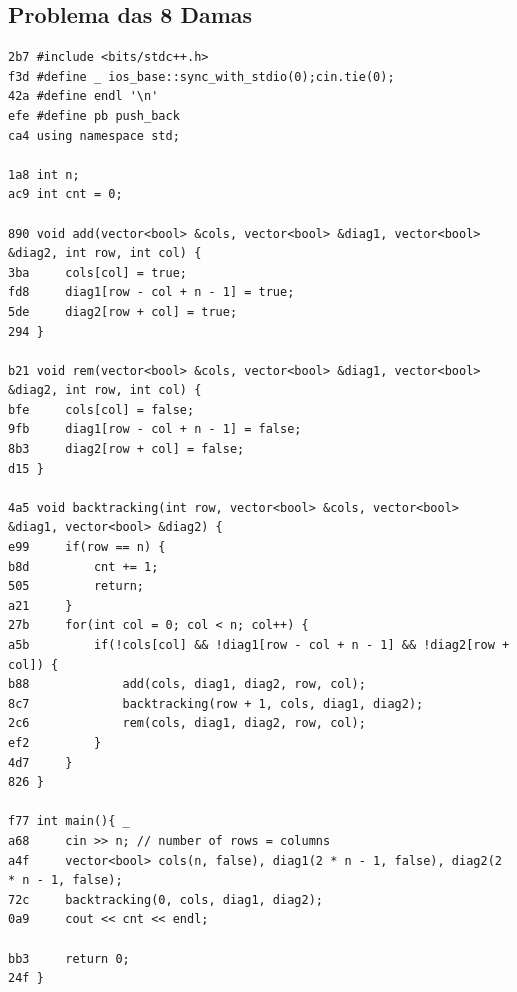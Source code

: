 \documentclass[11pt, a4paper, twoside]{article}
\begin{document}
\subsection{Problema das 8 Damas}
\begin{lstlisting}
2b7 #include <bits/stdc++.h>
f3d #define _ ios_base::sync_with_stdio(0);cin.tie(0);
42a #define endl '\n'
efe #define pb push_back
ca4 using namespace std;

1a8 int n;
ac9 int cnt = 0;

890 void add(vector<bool> &cols, vector<bool> &diag1, vector<bool> &diag2, int row, int col) {
3ba     cols[col] = true;
fd8     diag1[row - col + n - 1] = true;
5de     diag2[row + col] = true;
294 }

b21 void rem(vector<bool> &cols, vector<bool> &diag1, vector<bool> &diag2, int row, int col) {
bfe     cols[col] = false;
9fb     diag1[row - col + n - 1] = false;
8b3     diag2[row + col] = false;
d15 }

4a5 void backtracking(int row, vector<bool> &cols, vector<bool> &diag1, vector<bool> &diag2) {
e99     if(row == n) {
b8d         cnt += 1;
505         return; 
a21     }                  
27b     for(int col = 0; col < n; col++) {
a5b         if(!cols[col] && !diag1[row - col + n - 1] && !diag2[row + col]) {
b88             add(cols, diag1, diag2, row, col);
8c7             backtracking(row + 1, cols, diag1, diag2);
2c6             rem(cols, diag1, diag2, row, col);
ef2         }
4d7     }
826 }

f77 int main(){ _
a68     cin >> n; // number of rows = columns
a4f     vector<bool> cols(n, false), diag1(2 * n - 1, false), diag2(2 * n - 1, false);
72c     backtracking(0, cols, diag1, diag2);
0a9     cout << cnt << endl;
    
bb3     return 0;
24f }
\end{lstlisting}
\end{document}
